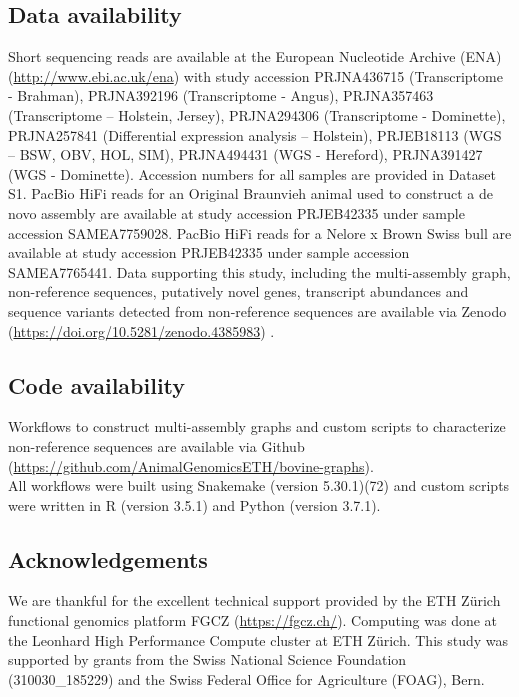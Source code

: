 \documentclass[../main.tex]{subfiles}
\begin{document}
\subsection*{Data availability}

Short sequencing reads are available at the European Nucleotide Archive (ENA) (\url{http://www.ebi.ac.uk/ena}) with study accession PRJNA436715 (Transcriptome - Brahman), PRJNA392196 (Transcriptome - Angus), PRJNA357463 (Transcriptome – Holstein, Jersey), PRJNA294306 (Transcriptome - Dominette), PRJNA257841 (Differential expression analysis – Holstein), PRJEB18113 (WGS – BSW, OBV, HOL, SIM), PRJNA494431 (WGS - Hereford), PRJNA391427 (WGS - Dominette). Accession numbers for all samples are provided in Dataset S1. PacBio HiFi reads for an Original Braunvieh animal used to construct a de novo assembly are available at study accession PRJEB42335 under sample accession SAMEA7759028. PacBio HiFi reads for a Nelore x Brown Swiss bull are available at study accession PRJEB42335 under sample accession SAMEA7765441. Data supporting this study, including the multi-assembly graph, non-reference sequences, putatively novel genes, transcript abundances and sequence variants detected from non-reference sequences are available via Zenodo (\url{https://doi.org/10.5281/zenodo.4385983}) \citep{Crysnanto2021}. 

\subsection*{Code availability}

Workflows to construct multi-assembly graphs and custom scripts to characterize non-reference sequences are available via Github \\
(\url{https://github.com/AnimalGenomicsETH/bovine-graphs}). \\
All workflows were built using Snakemake (version 5.30.1)(72) and custom scripts were written in R (version 3.5.1) \citep{RCoreTeam2017} and Python (version 3.7.1). 

\subsection*{Acknowledgements}

We are thankful for the excellent technical support provided by the ETH Zürich functional genomics platform FGCZ (\url{https://fgcz.ch/}). Computing was done at the Leonhard High Performance Compute cluster at ETH Zürich. This study was supported by grants from the Swiss National Science Foundation (310030\_185229) and the Swiss Federal Office for Agriculture (FOAG), Bern.



\singlespacing
\footnotesize







\ifdefined\BuildingFromMainFile
\else
   
\end{document}
